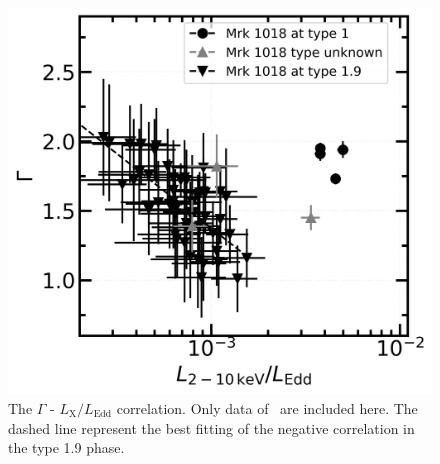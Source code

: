 \begin{figure}
\centering
	\includegraphics[width=\linewidth]{./pic/xrt_only-errorbar-Lrate-g-tmap_brokenlinear_dot.png}
    \caption{The $\Gamma$ - $L_\mathrm{X}/L_\mathrm{Edd}$ correlation. Only data of \xrt\, are included here. The dashed line represent the best fitting of the negative correlation in the type 1.9 phase.}
    \label{fig:xrayappendgood-Lrateandg-tmap}
\end{figure}
